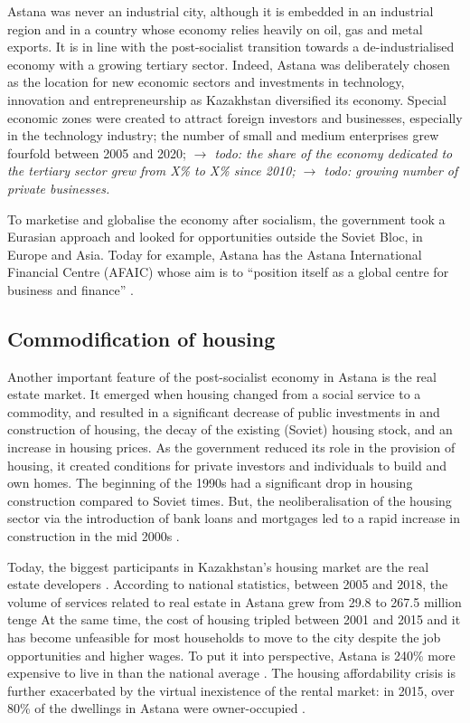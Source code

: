 \documentclass{article}
\begin{document}
Astana was never an industrial city, although it is embedded in an industrial region and in a country whose economy relies heavily on oil, gas and metal exports. It is in line with the post-socialist transition towards a de-industrialised economy with a growing tertiary sector.
Indeed, Astana was deliberately chosen as the location for new economic sectors and investments in technology, innovation and entrepreneurship as Kazakhstan diversified its economy. Special economic zones were created to attract foreign investors and businesses, especially in the technology industry; the number of small and medium enterprises grew fourfold between 2005 and 2020; \textit{$\rightarrow$ todo: the share of the economy dedicated to the tertiary sector grew from X\% to X\% since 2010; $\rightarrow$ todo: growing number of private businesses.}

To marketise and globalise the economy after socialism, the government took a Eurasian approach and looked for opportunities outside the Soviet Bloc, in Europe and Asia. Today for example, Astana has the Astana International Financial Centre (AFAIC) whose aim is to ``position itself as a global centre for business and finance'' \parencite{aifc}. 

\subsection{Commodification of housing}

Another important feature of the post-socialist economy in Astana is the real estate market. It emerged when housing changed from a social service to a commodity, and resulted in a significant decrease of public investments in and construction of housing, the decay of the existing (Soviet) housing stock, and an increase in housing prices. 
As the government reduced its role in the provision of housing, it created conditions for private investors and individuals to build and own homes. The beginning of the 1990s had a significant drop in housing construction compared to Soviet times. But, the neoliberalisation of the housing sector via the introduction of bank loans and mortgages led to a rapid increase in construction in the mid 2000s \parencite{unece2018housing}.

Today, the biggest participants in Kazakhstan's housing market are the real estate developers \parencite{unece2018housing}. According to national statistics, between 2005 and 2018, the volume of services related to real estate in Astana grew from 29.8 to 267.5 million tenge %
At the same time, the cost of housing tripled between 2001 and 2015 \parencite{seitz2021urbanization} and it has become unfeasible for most households to move to the city despite the job opportunities and higher wages. To put it into perspective, Astana is 240\% more expensive to live in than the national average \parencite{seitz2021urbanization}. The housing affordability crisis is further exacerbated by the virtual inexistence of the rental market: in 2015, over 80\% of the dwellings in Astana were owner-occupied \parencite{seitz2021urbanization}.
\end{document}
